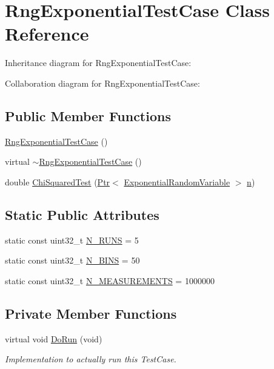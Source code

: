 \hypertarget{classRngExponentialTestCase}{}\section{Rng\+Exponential\+Test\+Case Class Reference}
\label{classRngExponentialTestCase}


Inheritance diagram for Rng\+Exponential\+Test\+Case\+:


Collaboration diagram for Rng\+Exponential\+Test\+Case\+:
\subsection*{Public Member Functions}
\begin{DoxyCompactItemize}
\item 
\hyperlink{classRngExponentialTestCase_abe59bb4b526a907fc5fe3ab5ae7f2cbe}{Rng\+Exponential\+Test\+Case} ()
\item 
virtual \hyperlink{classRngExponentialTestCase_ab225e6e33fa7aa99ffce95fb849dc539}{$\sim$\+Rng\+Exponential\+Test\+Case} ()
\item 
double \hyperlink{classRngExponentialTestCase_a73e697e9720a2cbb13aa8eadbfe798ae}{Chi\+Squared\+Test} (\hyperlink{classns3_1_1Ptr}{Ptr}$<$ \hyperlink{classns3_1_1ExponentialRandomVariable}{Exponential\+Random\+Variable} $>$ \hyperlink{lte__link__budget__x2__handover__measures_8m_abdb05bc5a064cf642a06c83b3392f148}{n})
\end{DoxyCompactItemize}
\subsection*{Static Public Attributes}
\begin{DoxyCompactItemize}
\item 
static const uint32\+\_\+t \hyperlink{classRngExponentialTestCase_a86f4a0ef3e982f89b5f9998a8a45855c}{N\+\_\+\+R\+U\+NS} = 5
\item 
static const uint32\+\_\+t \hyperlink{classRngExponentialTestCase_a3e1ecbc6f135ba2a0e7e8ebbf857266e}{N\+\_\+\+B\+I\+NS} = 50
\item 
static const uint32\+\_\+t \hyperlink{classRngExponentialTestCase_a5cc43f88e4833980decd750046f9d989}{N\+\_\+\+M\+E\+A\+S\+U\+R\+E\+M\+E\+N\+TS} = 1000000
\end{DoxyCompactItemize}
\subsection*{Private Member Functions}
\begin{DoxyCompactItemize}
\item 
virtual void \hyperlink{classRngExponentialTestCase_a47cf97f51446dcc3f6ff962cf3842cc2}{Do\+Run} (void)
\begin{DoxyCompactList}\small\item\em Implementation to actually run this Test\+Case. \end{DoxyCompactList}\end{DoxyCompactItemize}

